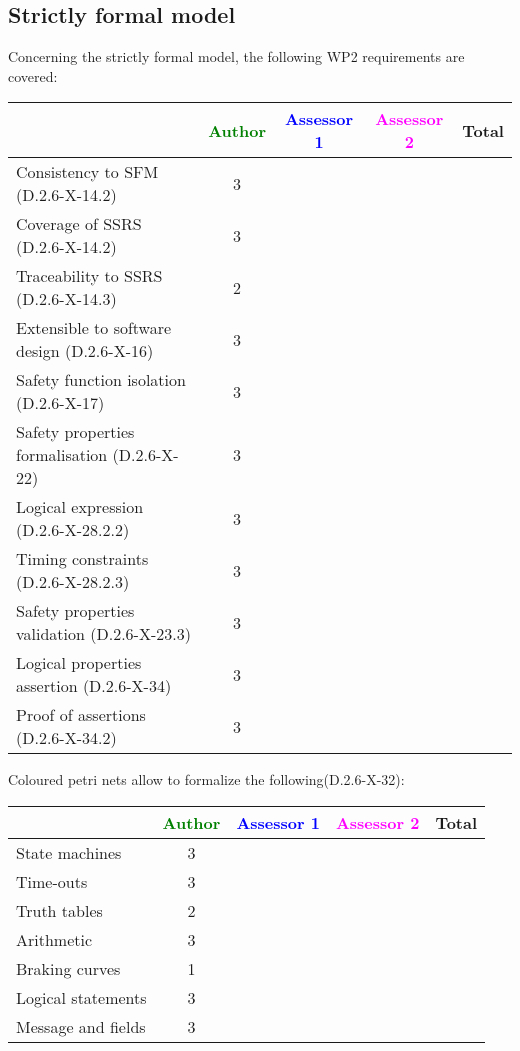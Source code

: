 \subsection{Strictly formal model}

Concerning the strictly formal model, the following WP2 requirements are covered:

\begin{tabular}{|l | c | c | c | c|}
\hline
& \textcolor{green}{Author} & \textcolor{blue}{Assessor 1} & \textcolor{magenta}{Assessor 2} & Total \\
\hline 
Consistency to SFM (D.2.6-X-14.2) & 3 & & &  \\
\hline
Coverage of SSRS (D.2.6-X-14.2)  & 3 & & &  \\
\hline
Traceability to  SSRS (D.2.6-X-14.3)  & 2 & & &  \\
\hline
Extensible to software design (D.2.6-X-16)  & 3 & & &  \\
\hline
Safety function isolation (D.2.6-X-17)  & 3 & & &  \\
\hline 
Safety properties formalisation (D.2.6-X-22)  & 3 & & &  \\
\hline
Logical expression (D.2.6-X-28.2.2)  & 3 & & &  \\
\hline
Timing constraints (D.2.6-X-28.2.3)  & 3 & & &  \\
\hline
Safety properties validation (D.2.6-X-23.3)  & 3 & & &  \\
\hline
Logical properties assertion (D.2.6-X-34)  & 3 & & &  \\
\hline
Proof of assertions (D.2.6-X-34.2)  & 3 & & &  \\
\hline
\end{tabular}

Coloured petri nets allow to formalize the following(D.2.6-X-32):

\begin{tabular}{|l | c | c | c | c|}
\hline
& \textcolor{green}{Author} & \textcolor{blue}{Assessor 1} & \textcolor{magenta}{Assessor 2} & Total \\
\hline 
State machines  & 3 & & &  \\
\hline
Time-outs  & 3 & & &  \\
\hline
Truth tables  & 2 & & &  \\
\hline
Arithmetic  & 3 & & &  \\
\hline
Braking curves  & 1 & & &  \\
\hline
Logical statements & 3 & & &  \\
\hline
Message and fields & 3 & & &  \\
\hline
\end{tabular}

